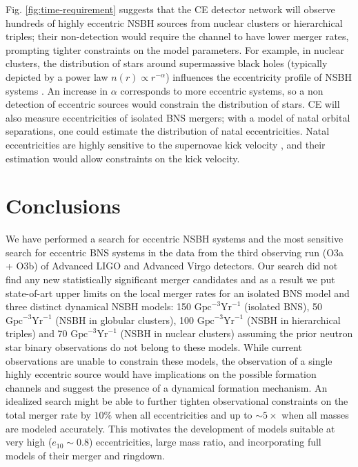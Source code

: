 Fig. \ref{fig:time-requirement} suggests that the CE detector network will observe hundreds of highly eccentric NSBH sources from nuclear clusters or hierarchical triples; their non-detection would require the channel to have lower merger rates, prompting tighter constraints on the model parameters. For example, in nuclear clusters, the distribution of stars around supermassive black holes (typically depicted by a power law $n(r) \propto r^{-\alpha}$) influences the eccentricity profile of NSBH systems \cite{Fragione:2018yrb}. An increase in $\alpha$ corresponds to more eccentric systems, so a non detection of eccentric sources would constrain the distribution of stars. CE will also measure eccentricities of isolated BNS mergers; with a model of natal orbital separations, one could estimate the distribution of natal eccentricities. Natal eccentricities are highly sensitive to the supernovae kick velocity \cite{Hobbs:2005yx, Richards:2022fnq}, and their estimation would allow constraints on the kick velocity.

\section{Conclusions}
We have performed a search for eccentric NSBH systems and the most sensitive search for eccentric BNS systems in the data from the third observing run (O3a + O3b) of Advanced LIGO and Advanced Virgo detectors. Our search did not find any new statistically significant merger candidates and as a result we put state-of-art upper limits on the local merger rates for an isolated BNS model and three distinct dynamical NSBH models:  150 $\text{Gpc}^{-3}\text{Yr}^{-1}$ (isolated BNS), 50 $\text{Gpc}^{-3}\text{Yr}^{-1}$ (NSBH in globular clusters), 100 $\text{Gpc}^{-3}\text{Yr}^{-1}$ (NSBH in hierarchical triples) and 70 $\text{Gpc}^{-3}\text{Yr}^{-1}$ (NSBH in nuclear clusters) assuming the prior neutron star binary observations do not belong to these models. While current observations are unable to constrain these models, the observation of a single highly eccentric source would have implications on the possible formation channels and suggest the presence of a dynamical formation mechanism.
An idealized search might be able to further tighten observational constraints on the total merger rate by $10 \%$ when all eccentricities and up to $\sim 5\times$ when all masses are modeled accurately. This motivates the development of models suitable at very high ($e_{10} \sim 0.8$) eccentricities, large mass ratio, and incorporating full models of their merger and ringdown. 

